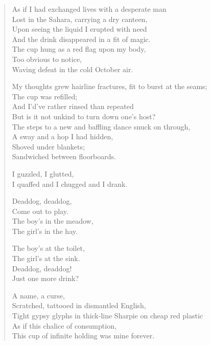 \begin{verse}
  As if I had exchanged lives with a desperate man\\
  Lost in the Sahara, carrying a dry canteen,\\
  Upon seeing the liquid I erupted with need\\
  And the drink disappeared in a fit of magic.\\
  The cup hung as a red flag upon my body,\\
  Too obvious to notice,\\
  Waving defeat in the cold October air.\par

  My thoughts grew hairline fractures, fit to burst at the seams;\\
  The cup was refilled;\\
  And I'd've rather rinsed than repeated\\
  But is it not unkind to turn down one's host?\\
  The steps to a new and baffling dance snuck on through,\\
  A sway and a hop I had hidden,\\
  Shoved under blankets;\\
  Sandwiched between floorboards.\par

  I guzzled, I glutted,\\
  I quaffed and I chugged and I drank.\\

  \secdiv

  Deaddog, deaddog,\\
  Come out to play.\\
  The boy's in the meadow,\\
  The girl's in the hay.\par

  The boy's at the toilet,\\
  The girl's at the sink.\\
  Deaddog, deaddog!\\
  Just one more drink?\\

  \secdiv

  A name, a curse,\\
  Scratched, tattooed in dismantled English,\\
  Tight gypsy glyphs in thick-line Sharpie on cheap red plastic\\
  As if this chalice of consumption,\\
  This cup of infinite holding was mine forever.\par


\end{verse}
